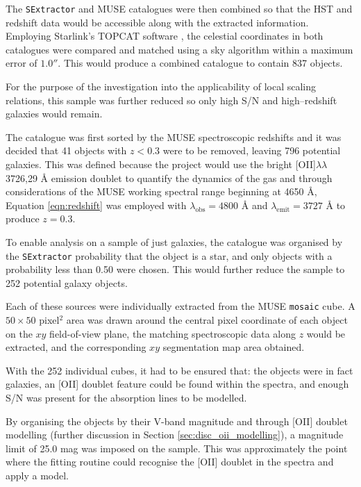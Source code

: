 \documentclass[12pt, twocolumn, nofootinbib]{revtex4-1}    %
\begin{document}
The \texttt{SExtractor} and MUSE catalogues were then combined so that the HST and redshift data would be accessible along with the extracted information. Employing Starlink's TOPCAT software \citep{2005ASPC..347...29T}, the celestial coordinates in both catalogues were compared and matched using a sky algorithm within a maximum error of $1.0''$. This would produce a combined catalogue to contain 837 objects.

For the purpose of the investigation into the applicability of local scaling relations, this sample was further reduced so only high S/N and high--redshift galaxies would remain. 

The catalogue was first sorted by the MUSE spectroscopic redshifts and it was decided that 41 objects with $z<0.3$ were to be removed, leaving 796 potential galaxies. This was defined because the project would use the bright [OII]$\lambda\lambda$3726,29 {\AA} emission doublet to quantify the dynamics of the gas and through considerations of the MUSE working spectral range beginning at 4650 {\AA}, Equation \ref{eqn:redshift} was employed with $\lambda_{\text{obs}}=4800$ {\AA} and $\lambda_{\text{emit}}=3727$ {\AA} to produce $z=0.3$. 

To enable analysis on a sample of just galaxies, the catalogue was organised by the \texttt{SExtractor} probability that the object is a star, and only objects with a probability less than 0.50 were chosen. This would further reduce the sample to 252 potential galaxy objects.

Each of these sources were individually extracted from the MUSE \texttt{mosaic} cube. A $50\times 50$ pixel$^2$ area was drawn around the central pixel coordinate of each object on the $xy$ field-of-view plane, the matching spectroscopic data along $z$ would be extracted, and the corresponding $xy$ segmentation map area obtained. 

With the 252 individual cubes, it had to be ensured that: the objects were in fact galaxies, an [OII] doublet feature could be found within the spectra, and enough S/N was present for the absorption lines to be modelled.  

By organising the objects by their V-band magnitude and through [OII] doublet modelling (further discussion in Section \ref{sec:disc_oii_modelling}), a magnitude limit of 25.0 mag was imposed on the sample. This was approximately the point where the fitting routine could recognise the [OII] doublet in the spectra and apply a model.
\end{document}
